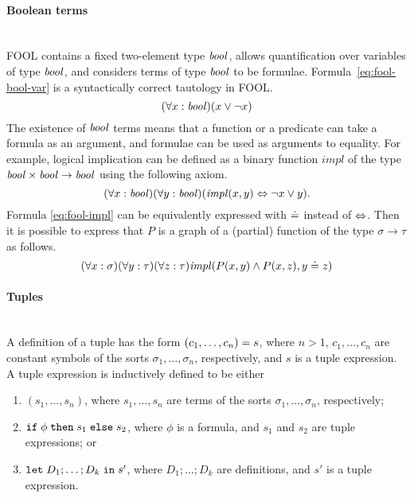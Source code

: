 \documentclass{easychair}
\begin{document}
\paragraph{Boolean terms}~\\
FOOL contains a fixed two-element type $\mathit{bool}$, allows quantification over 
variables of type $\mathit{bool}$, and considers terms of type $\mathit{bool}$ to be formulae. 
Formula~\ref{eq:fool-bool-var} is a syntactically correct tautology in FOOL.
\begin{equation}\label{eq:fool-bool-var}
(\forall x:\mathit{bool})(x \lor \neg x)
\end{equation}
The existence of $\mathit{bool}$ terms means that a function or a predicate can take 
a formula as an argument, and formulae can be used as arguments to equality.
For example, logical implication can be defined as a binary function
$\mathit{impl}$ of the type $\mathit{bool} \times \mathit{bool} \to \mathit{bool}$ using the following
axiom.
\begin{equation}\label{eq:fool-impl}
(\forall x:\mathit{bool})(\forall y:\mathit{bool})(\mathit{impl}(x,y) \Leftrightarrow \neg x \lor y).
\end{equation}
Formula \ref{eq:fool-impl} can be equivalently expressed with $\doteq$ instead of
$\Leftrightarrow$.
Then it is possible to express that $P$ is a graph of a (partial) function of 
the type $\sigma \to \tau$ as follows.
\begin{equation}\label{eq:bool-arg-example}
(\forall x:\sigma)(\forall y:\tau)(\forall z:\tau)
\mathit{impl}(P(x,y) \land P(x,z), y \doteq z)
\end{equation}

\paragraph{Tuples}~\\
A definition of a tuple has the form ${(c_1,\ldots,c_n)}={s}$, where
$n > 1$, $c_1,\ldots,c_n$ are constant symbols of the sorts
$\sigma_1,\ldots,\sigma_n$, respectively, and $s$ is a tuple expression.
A tuple expression is inductively defined to be either
\begin{enumerate}
  \item $(s_1,\ldots,s_n)$, where $s_1,\ldots,s_n$ are terms of the sorts
        $\sigma_1,\ldots,\sigma_n$, respectively;
  \item $\mathtt{if}\;{\phi}\;\allowbreak\mathtt{then}\;{s_1}\;\allowbreak\mathtt{else}\;{s_2}$, where $\phi$ is a formula, and $s_1$ and $s_2$
        are tuple expressions; or
  \item $\mathtt{let}\;{D_1;\ldots;D_k}\;\allowbreak\mathtt{in}\;{s'}$, where $D_1;\ldots;D_k$ are definitions,
        and $s'$ is a tuple expression.
\end{enumerate}
\end{document}
